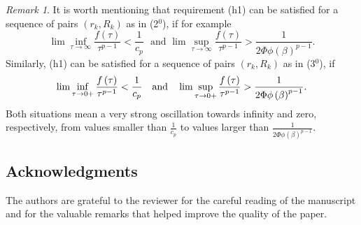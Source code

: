 \documentclass{birkjour}
\theoremstyle{definition}
\theoremstyle{remark}
\newtheorem{remark}[theorem]{Remark}
\numberwithin{equation}{section}
\begin{document}
\begin{remark}
It is worth mentioning that requirement (h1) can be satisfied for a sequence
of pairs $(r_{k},R_{k})$ as in (2$^{0}$), if for example%
\begin{equation*}
\lim \inf_{\tau \rightarrow \infty }\frac{f\left( \tau \right) }{\tau ^{p-1}}%
<\frac{1}{c_{p}}\ \ \ \text{and\ \ \ }\lim \sup_{\tau \rightarrow \infty }%
\frac{f\left( \tau \right) }{\tau ^{p-1}}>\frac{1}{2\Phi \phi \left( \beta
\right) ^{p-1}}.
\end{equation*}%
Similarly, (h1) can be satisfied for a sequence of pairs $(r_{k},R_{k})$ as
in (3$^{0}$), if
\begin{equation*}
\lim \inf_{\tau \rightarrow 0+}\frac{f\left( \tau \right) }{\tau ^{p-1}}<%
\frac{1}{c_{p}}\ \ \ \text{and\ \ \ }\lim \sup_{\tau \rightarrow 0+}\frac{%
f\left( \tau \right) }{\tau ^{p-1}}>\frac{1}{2\Phi \phi \left( \beta \right)
^{p-1}}.
\end{equation*}%
Both situations mean a very strong oscillation towards infinity and zero,
respectively, from values smaller than $\frac{1}{c_{p}}$ to values larger
than $\frac{1}{2\Phi \phi \left( \beta \right) ^{p-1}}.$
\end{remark}
\subsection*{Acknowledgments}

The authors are grateful to the reviewer for the careful reading of the
manuscript and for the valuable remarks that helped improve the quality of
the paper.




\end{document}

